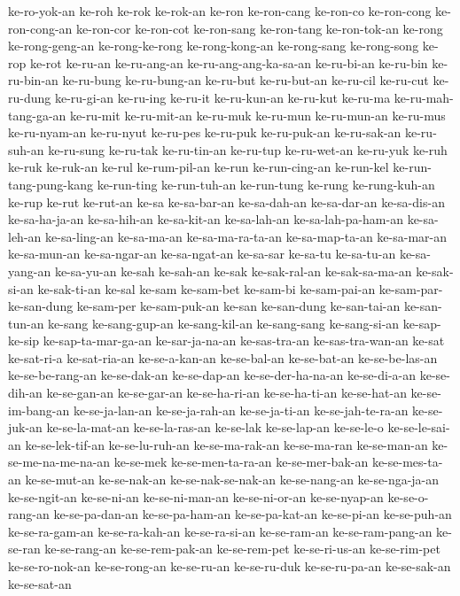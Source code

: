 {ke-ro-yok-an ke-roh ke-rok ke-rok-an ke-ron ke-ron-cang ke-ron-co
ke-ron-cong ke-ron-cong-an ke-ron-cor ke-ron-cot ke-ron-sang ke-ron-tang
ke-ron-tok-an ke-rong ke-rong-geng-an ke-rong-ke-rong ke-rong-kong-an
ke-rong-sang ke-rong-song ke-rop ke-rot ke-ru-an ke-ru-ang-an
ke-ru-ang-ang-ka-sa-an ke-ru-bi-an ke-ru-bin ke-ru-bin-an ke-ru-bung
ke-ru-bung-an ke-ru-but ke-ru-but-an ke-ru-cil ke-ru-cut ke-ru-dung
ke-ru-gi-an ke-ru-ing ke-ru-it ke-ru-kun-an ke-ru-kut ke-ru-ma
ke-ru-mah-tang-ga-an ke-ru-mit ke-ru-mit-an ke-ru-muk ke-ru-mun
ke-ru-mun-an ke-ru-mus ke-ru-nyam-an ke-ru-nyut ke-ru-pes ke-ru-puk
ke-ru-puk-an ke-ru-sak-an ke-ru-suh-an ke-ru-sung ke-ru-tak ke-ru-tin-an
ke-ru-tup ke-ru-wet-an ke-ru-yuk ke-ruh ke-ruk ke-ruk-an ke-rul
ke-rum-pil-an ke-run ke-run-cing-an ke-run-kel ke-run-tang-pung-kang
ke-run-ting ke-run-tuh-an ke-run-tung ke-rung ke-rung-kuh-an ke-rup ke-rut
ke-rut-an ke-sa ke-sa-bar-an ke-sa-dah-an ke-sa-dar-an ke-sa-dis-an
ke-sa-ha-ja-an ke-sa-hih-an ke-sa-kit-an ke-sa-lah-an ke-sa-lah-pa-ham-an
ke-sa-leh-an ke-sa-ling-an ke-sa-ma-an ke-sa-ma-ra-ta-an ke-sa-map-ta-an
ke-sa-mar-an ke-sa-mun-an ke-sa-ngar-an ke-sa-ngat-an ke-sa-sar ke-sa-tu
ke-sa-tu-an ke-sa-yang-an ke-sa-yu-an ke-sah ke-sah-an ke-sak
ke-sak-ral-an ke-sak-sa-ma-an ke-sak-si-an ke-sak-ti-an ke-sal ke-sam
ke-sam-bet ke-sam-bi ke-sam-pai-an ke-sam-par-ke-san-dung ke-sam-per
ke-sam-puk-an ke-san ke-san-dung ke-san-tai-an ke-san-tun-an ke-sang
ke-sang-gup-an ke-sang-kil-an ke-sang-sang ke-sang-si-an ke-sap-ke-sip
ke-sap-ta-mar-ga-an ke-sar-ja-na-an ke-sas-tra-an ke-sas-tra-wan-an ke-sat
ke-sat-ri-a ke-sat-ria-an ke-se-a-kan-an ke-se-bal-an ke-se-bat-an
ke-se-be-las-an ke-se-be-rang-an ke-se-dak-an ke-se-dap-an
ke-se-der-ha-na-an ke-se-di-a-an ke-se-dih-an ke-se-gan-an ke-se-gar-an
ke-se-ha-ri-an ke-se-ha-ti-an ke-se-hat-an ke-se-im-bang-an
ke-se-ja-lan-an ke-se-ja-rah-an ke-se-ja-ti-an ke-se-jah-te-ra-an
ke-se-juk-an ke-se-la-mat-an ke-se-la-ras-an ke-se-lak ke-se-lap-an
ke-se-le-o ke-se-le-sai-an ke-se-lek-tif-an ke-se-lu-ruh-an
ke-se-ma-rak-an ke-se-ma-ran ke-se-man-an ke-se-me-na-me-na-an ke-se-mek
ke-se-men-ta-ra-an ke-se-mer-bak-an ke-se-mes-ta-an ke-se-mut-an
ke-se-nak-an ke-se-nak-se-nak-an ke-se-nang-an ke-se-nga-ja-an
ke-se-ngit-an ke-se-ni-an ke-se-ni-man-an ke-se-ni-or-an ke-se-nyap-an
ke-se-o-rang-an ke-se-pa-dan-an ke-se-pa-ham-an ke-se-pa-kat-an
ke-se-pi-an ke-se-puh-an ke-se-ra-gam-an ke-se-ra-kah-an ke-se-ra-si-an
ke-se-ram-an ke-se-ram-pang-an ke-se-ran ke-se-rang-an ke-se-rem-pak-an
ke-se-rem-pet ke-se-ri-us-an ke-se-rim-pet ke-se-ro-nok-an ke-se-rong-an
ke-se-ru-an ke-se-ru-duk ke-se-ru-pa-an ke-se-sak-an ke-se-sat-an
}
